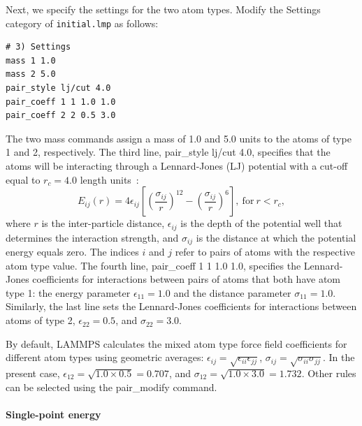 \documentclass[9pt,tutorial]{livecoms}
\newcommand{\lmpcmd}[1]{\colorbox{listing}{\textcolor{command}{\small{#1}}}} %
\newcommand{\flecmd}[1]{\textcolor{command}{\texttt{#1}}} %
\begin{document}
Next, we specify the settings for the two atom types.  Modify the
\lmpcmd{Settings} category of \flecmd{initial.lmp} as follows:
\begin{lstlisting}
# 3) Settings
mass 1 1.0
mass 2 5.0
pair_style lj/cut 4.0
pair_coeff 1 1 1.0 1.0
pair_coeff 2 2 0.5 3.0
\end{lstlisting}
The two \lmpcmd{mass} commands assign a mass of 1.0 and 5.0 units to the
atoms of type 1 and 2, respectively.  The third line,
\lmpcmd{pair\_style lj/cut 4.0}, specifies that the atoms will be
interacting through a Lennard-Jones (LJ) potential with a cut-off equal
to $r_c = 4.0$ length units~\cite{wang2020lennard,fischer2023history}:
\begin{equation}
E_{ij} (r) = 4 \epsilon_{ij} \left[ \left( \dfrac{\sigma_{ij}}{r} \right)^{12}
  - \left( \dfrac{\sigma_{ij}}{r} \right)^{6} \right], ~ \text{for} ~ r < r_c,
\label{eq:LJ}
\end{equation}
where $r$ is the inter-particle distance, $\epsilon_{ij}$ is the depth
of the potential well that determines the interaction strength, and
$\sigma_{ij}$ is the distance at which the potential energy equals zero.
The indices $i$ and $j$ refer to pairs of atoms {\color{blue} with the
  respective atom type value}.  The fourth line, \lmpcmd{pair\_coeff 1 1
  1.0 1.0}, specifies the Lennard-Jones coefficients for interactions
between pairs of atoms {\color{blue} that both have} atom type 1: the
energy parameter $\epsilon_{11} = 1.0$ and the distance parameter
$\sigma_{11} = 1.0$.  Similarly, the last line sets the Lennard-Jones
coefficients for interactions between atoms of type 2,
$\epsilon_{22} = 0.5$, and $\sigma_{22} = 3.0$.

\begin{note}
  By default, LAMMPS calculates the {\color{blue} mixed atom type} force
  field coefficients for different atom types using geometric averages:
  $\epsilon_{ij} = \sqrt{\epsilon_{ii} \epsilon_{jj}}$,
  $\sigma_{ij} = \sqrt{\sigma_{ii} \sigma_{jj}}$.  In the present case,
  $\epsilon_{12} = \sqrt{1.0 \times 0.5} = 0.707$, and
  $\sigma_{12} = \sqrt{1.0 \times 3.0} = 1.732$. {\color{blue}Other
    rules can be selected using the \lmpcmd{pair\_modify} command.}
\end{note}

\paragraph{Single-point energy}
\end{document}

